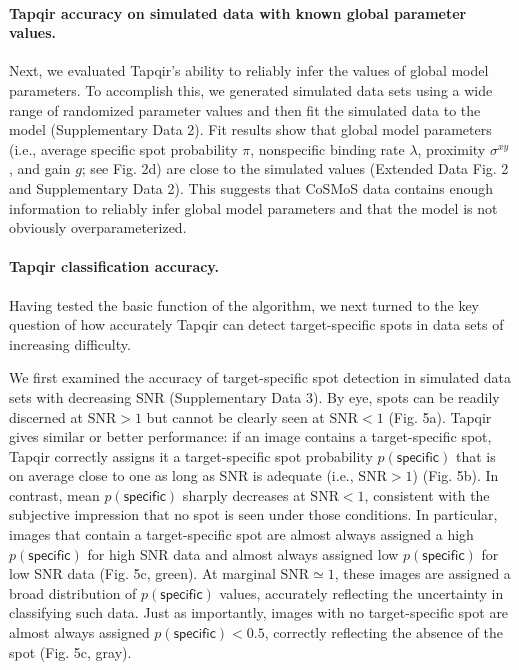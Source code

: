 \paragraph{Tapqir accuracy on simulated data with known global parameter values.}
Next, we evaluated Tapqir's ability to reliably infer the values of global model parameters. To  accomplish this, we generated simulated data sets using a wide range of randomized parameter values and then fit the simulated data to the model (Supplementary Data 2). Fit results show that global model parameters (i.e., average specific spot probability $\pi$, nonspecific binding rate $\lambda$, proximity $\sigma^{xy}$, and gain $g$; see Fig. 2d) are close to the simulated values (Extended Data Fig. 2 and Supplementary Data 2). This suggests that CoSMoS data contains enough information to reliably infer global model parameters and that the model is not obviously overparameterized. 

\paragraph{Tapqir classification accuracy.} Having tested the basic function of the algorithm, we next turned to the key question of how accurately Tapqir can detect target-specific spots in data sets of increasing difficulty.

We first examined the accuracy of target-specific spot detection in simulated data sets with decreasing SNR (Supplementary Data 3). By eye, spots can be readily discerned at $\mathrm{SNR}>1$ but cannot be clearly seen at $\mathrm{SNR}<1$ (Fig. 5a). Tapqir gives similar or better performance:  if an image contains a target-specific spot, Tapqir correctly assigns it a target-specific spot probability $p(\mathsf{specific})$ that is on average close to one as long as SNR is adequate (i.e., $\mathrm{SNR}>1$) (Fig. 5b).  In contrast, mean $p(\mathsf{specific})$ sharply decreases at $\mathrm{SNR}<1$, consistent with the subjective impression that no spot is seen under those conditions.  In particular, images that contain a target-specific spot are almost always assigned a high $p(\mathsf{specific})$ for high SNR data and almost always assigned low $p(\mathsf{specific})$ for low SNR data (Fig. 5c, green).  At marginal $\mathrm{SNR} \simeq 1$, these images are assigned a broad distribution of $p(\mathsf{specific})$ values, accurately reflecting the uncertainty in classifying such data.  Just as importantly, images with no target-specific spot are almost always assigned $p(\mathsf{specific}) < 0.5$, correctly reflecting the absence of the spot (Fig. 5c, gray).

